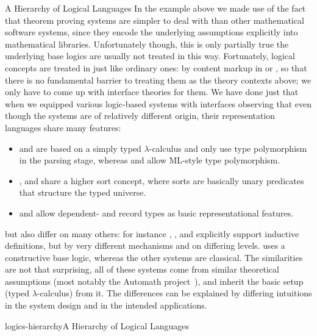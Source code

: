 \begin{tsubsection}[id=integrating-logics]{A Hierarchy of Logical Languages}
  In the example above we made use of the fact that theorem proving systems are simpler to
  deal with than other mathematical software systems, since they encode the underlying
  assumptions explicitly into mathematical libraries. Unfortunately though, this is only
  partially true the underlying base logics are usually not treated in this
  way. Fortunately, logical concepts are treated in {\omdoc} just like ordinary ones: by
  content markup in {\cmathml} or {\openmath}, so that there is no fundamental barrier to
  treating them as the theory contexts above; we only have to come up with interface
  theories for them. We have done just that when we equipped various logic-based systems
  with {\omdoc} interfaces observing that even though the systems are of relatively
  different origin, their representation languages share many features:
  \begin{itemize}
  \item {\tps} and {\pvs} are based on a simply typed $\lambda$-calculus and only use type
    polymorphism in the parsing stage, whereas {\OMEGA} and {\lambdaclam} allow ML-style
    type polymorphism.
  \item {\OMEGA}, {\inka} and {\pvs} share a higher sort concept, where sorts are
    basically unary predicates that structure the typed universe.
  \item {\pvs} and {\coq} allow dependent- and record types as basic representational
    features.
  \end{itemize}
  but also differ on many others: for instance {\inka}, {\pvs}, and {\coq} explicitly
  support inductive definitions, but by very different mechanisms and on differing
  levels. {\coq} uses a constructive base logic, whereas the other systems are classical.
  The similarities are not that surprising, all of these systems come from similar
  theoretical assumptions (most notably the Automath project~\cite{Bruijn80}), and inherit
  the basic setup (typed $\lambda$-calculus) from it. The differences can be explained by
  differing intuitions in the system design and in the intended applications.

\begin{myfig}{logics-hierarchy}{A Hierarchy of Logical Languages}\vspace*{-.5cm}
\end{myfig}
\end{tsubsection}
